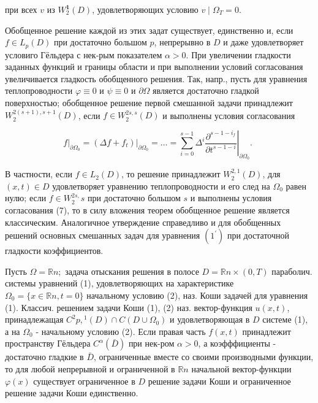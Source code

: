 \documentclass[10pt]{article}
\begin{document}
при всех $v$ из $W_{2}^{\mathbf{1}}(D)$, удовлетворяющих условию $v \mid \Omega_{T}=0$.



Обобщенное решение каждой из этих задат существует, единственно и, если $f \in L_{p}(D)$ при достаточно большом $p$, непрерывно в $D$ и даже удовлетворяет условиго Гёльдера с нек-рым показателем $\alpha>0$. При увеличении гладкости заданных функций и границы области и при выполнении условий согласования увеличивается гладкость обобщенного решения. Так, напр., пусть для уравнения теплопроводности $\varphi \equiv 0$ и $\psi \equiv 0$ и $\partial \Omega$ является достаточно гладкой поверхностью; обобщенное решение первой смешанной задачи принадлежит $W_{2}^{2(s+1), s+1}(D)$, если $f \in W_{2}^{2 s, s}(D)$ и выполнены условия согласования



\[

\left.f\right|_{\partial \Omega_{0}}=\left.\left(\Delta f+f_{t}\right)\right|_{\partial \Omega_{0}}=\ldots=\left.\sum_{i=0}^{s-1} \Delta^{i} \frac{\partial^{s-1-i_{f}}}{\partial t^{s-1-i}}\right|_{\partial \Omega_{0}} \text {. }

\]



В частности, если $f \in L_{2}(D)$, то решение принадлежит $W_{2}^{2,1}(D)$, для $(x, t) \in D$ удовлетворяет уравнению теплопроводности и его след на $\Omega_{0}$ равен нулю; если $f \in W_{2}^{2 s,} s$ при достаточно большом $s$ и выполнены условия согласования (7), то в силу вложения теорем обобщенное решение является классическим. Аналогичное утверждение справедливо и для обобщенных решений основных смешанных задач для уравнения $\left(1^{\prime}\right)$ при достаточной гладкости коэффициентов.



Пусть $\Omega=\mathbb{R} n ;$ задача отыскания решения в полосе $D=\mathbb{R} n \times(0, T)$ параболич. системы уравнений (1), удовлетворяющих на характеристике $\Omega_{0}=\{x \in \mathbb{R} n, t=0\}$ начальному условию (2), наз. Коши задачей для уравнения (1). Классич. решением задачи Коши (1), (2) наз. вектор-функция $u(x, t)$, принадлежащая $C^{2} p,{ }^{1}(D) \cap C\left(D \cup \Omega_{0}\right)$ и удовлетворяющая в $D$ системе (1), а на $\Omega_{0}$ - начальному условию (2). Если правая часть $f(x, t)$ принадлежит пространству Гёльдера $C^{\alpha}(\bar{D})$ при нек-ром $\alpha>0$, а коэфффициенты - достаточно гладкие в $\bar{D}$, ограниченные вместе со своими производными функции, то для любой непрерывной и ограниченной в $\mathbb{R} n$ начальной вектор-функции $\varphi(x)$ существует ограниченное в $D$ решение задачи Коши и ограниченное решение задачи Коши единственно.
\end{document}
